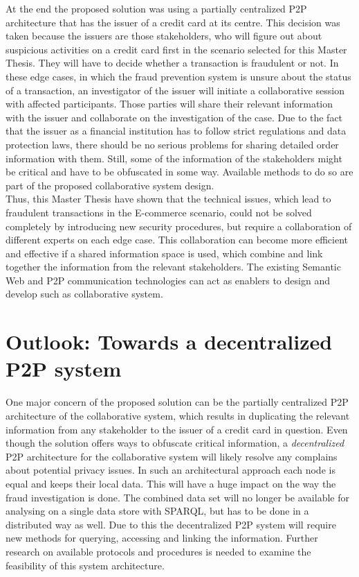 At the end the proposed solution was using a partially centralized \gls{P2P} architecture that has the issuer of a credit card at its centre. This decision was taken because the issuers are those stakeholders, who will figure out about suspicious activities on a credit card first in the scenario selected for this Master Thesis. They will have to decide whether a transaction is fraudulent or not. In these edge cases, in which the fraud prevention system is unsure about the status of a transaction, an investigator of the issuer will initiate a collaborative session with affected participants. Those parties will share their relevant information with the issuer and collaborate on the investigation of the case. Due to the fact that the issuer as a financial institution has to follow strict regulations and data protection laws, there should be no serious problems for sharing detailed order information with them. Still, some of the information of the stakeholders might be critical and have to be obfuscated in some way. Available methods to do so are part of the proposed collaborative system design. \\

Thus, this Master Thesis have shown that the technical issues, which lead to fraudulent transactions in the \gls{E-commerce} scenario, could not be solved completely by introducing new security procedures, but require a collaboration of different experts on each edge case. This collaboration can become more efficient and effective if a shared information space is used, which combine and link together the information from the relevant stakeholders. The existing Semantic Web and \gls{P2P} communication technologies can act as enablers to design and develop such as collaborative system.

\section{Outlook: Towards a decentralized \gls{P2P} system}
\label{sec:p2p_decentralized_system}

One major concern of the proposed solution can be the partially centralized \gls{P2P} architecture of the collaborative system, which results in duplicating the relevant information from any stakeholder to the issuer of a credit card in question. Even though the solution offers ways to obfuscate critical information, a \emph{decentralized} \gls{P2P} architecture for the collaborative system will likely resolve any complains about potential privacy issues. In such an architectural approach each node is equal and keeps their local data. This will have a huge impact on the way the fraud investigation is done. The combined data set will no longer be available for analysing on a single data store with \gls{SPARQL}, but has to be done in a distributed way as well. Due to this the decentralized \gls{P2P} system will require new methods for querying, accessing and linking the information. Further research on available protocols and procedures is needed to examine the feasibility of this system architecture.


